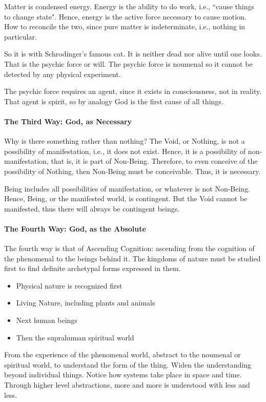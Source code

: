 Matter is condensed energy. Energy is the ability to do work, i.e., ``cause things to change state". Hence, energy is the active force necessary to cause motion. How to reconcile the two, since pure matter is indeterminate, i.e., nothing in particular.

So it is with Schrodinger's famous cat. It is neither dead nor alive until one looks. That is the psychic force or will. The psychic force is noumenal so it cannot be detected by any physical experiment.

The psychic force requires an agent, since it exists in consciousness, not in reality. That agent is spirit, so by analogy God is the first cause of all things.

\paragraph{The Third Way: God, as Necessary}
Why is there something rather than nothing? The Void, or Nothing, is not a possibility of manifestation, i.e., it does not exist. Hence, it is a possibility of non-manifestation, that is, it is part of Non-Being. Therefore, to even conceive of the possibility of Nothing, then Non-Being must be conceivable. Thus, it is necessary.

Being includes all possibilities of manifestation, or whatever is not Non-Being. Hence, Being, or the manifested world, is contingent. But the Void cannot be manifested, thus there will always be contingent beings.

\paragraph{The Fourth Way: God, as the Absolute}
The fourth way is that of Ascending Cognition: ascending from the cognition of the phenomenal to the beings behind it. The kingdoms of nature must be studied first to find definite archetypal forms expressed in them.

\begin{itemize}
\item Physical nature is recognized first 
\item Living Nature, including plants and animals 
\item Next human beings 
\item Then the suprahuman spiritual world 
\end{itemize}
From the experience of the phenomenal world, abstract to the noumenal or spiritual world, to understand the form of the thing. Widen the understanding beyond individual things. Notice how systems take place in space and time. Through higher level abstractions, more and more is understood with less and less.

